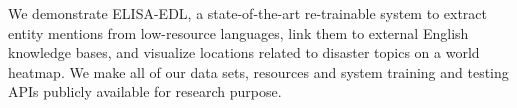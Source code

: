 We demonstrate ELISA-EDL, a state-of-the-art re-trainable system to extract entity mentions from low-resource languages, link them to external English knowledge bases, and visualize locations related to disaster topics on a world heatmap. We make all of our data sets, resources and system training and testing APIs publicly available for research purpose.
